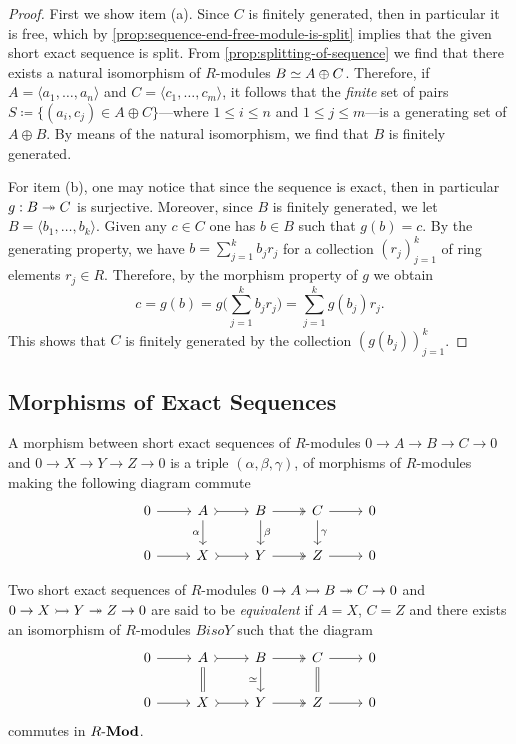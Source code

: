 \begin{proof}
First we show item (a). Since \(C\) is finitely generated, then in particular it is free, which by
\cref{prop:sequence-end-free-module-is-split} implies that the given short exact
sequence is split. From \cref{prop:splitting-of-sequence} we find that there
exists a natural isomorphism of \(R\)-modules \(B \simeq A \oplus C\). Therefore,
if \(A = \langle a_1, \dots, a_n \rangle\) and \(C = \langle c_1, \dots, c_m
\rangle\), it follows that the \emph{finite} set of pairs \(S \coloneq \{(a_i,
c_j) \in A \oplus C\}\)---where \(1 \leq i \leq n\) and \(1 \leq j \leq m\)---is
a generating set of \(A \oplus B\). By means of the natural isomorphism, we find
that \(B\) is finitely generated.

For item (b), one may notice that since the sequence is exact, then in
particular \(g: B \twoheadrightarrow C\) is surjective. Moreover, since \(B\) is finitely
generated, we let \(B = \langle b_1, \dots, b_k \rangle\). Given any \(c \in C\)
one has \(b \in B\) such that \(g(b) = c\). By the generating property, we have
\(b = \sum_{j=1}^k b_j r_j\) for a collection \((r_j)_{j=1}^k\) of ring elements
\(r_j \in R\). Therefore, by the morphism property of \(g\) we obtain
\[
c = g(b) = g\big(\sum_{j=1}^k b_j r_j \big) = \sum_{j=1}^k g(b_j) r_j.
\]
This shows that \(C\) is finitely generated by the collection
\((g(b_j))_{j=1}^k\).
\end{proof}

\subsection{Morphisms of Exact Sequences}

\begin{definition}
\label{def:morphism-short-exact-sequences}
A morphism between short exact sequences of \(R\)-modules
\(0 \to A \to B \to C \to 0\) and \(0 \to X \to Y \to Z \to 0\) is a triple
\((\alpha, \beta, \gamma)\), of morphisms of \(R\)-modules making the following
diagram commute
\[
\begin{tikzcd}
0 \ar[r] &A \ar[r, tail] \ar[d, "\alpha"']
&B \ar[r, two heads] \ar[d, "\beta"]
&C \ar[r] \ar[d, "\gamma"]
&0 \\
0 \ar[r] &X \ar[r, tail] &Y \ar[r, two heads] &Z \ar[r] &0
\end{tikzcd}
\]
\end{definition}

\begin{definition}
\label{def:equivalent-short-exact-sequences}
Two short exact sequences of \(R\)-modules \(0 \to A \rightarrowtail B \twoheadrightarrow C \to 0\) and \(0 \to X \rightarrowtail Y
\twoheadrightarrow Z \to 0\) are said to be \emph{equivalent} if \(A = X\), \(C = Z\) and
there exists an isomorphism of \(R\)-modules \(B iso Y\) such that the diagram
\[
\begin{tikzcd}
0 \ar[r] &A \ar[r, tail] \ar[d, equal]
&B \ar[r, two heads] \ar[d, "\dis"']
&C \ar[r] \ar[d, equal]
&0 \\
0 \ar[r]
&X \ar[r, tail]
&Y \ar[r, two heads]
&Z \ar[r]
&0
\end{tikzcd}
\]
commutes in \({R\text{-}\textbf{Mod}}\).
\end{definition}

